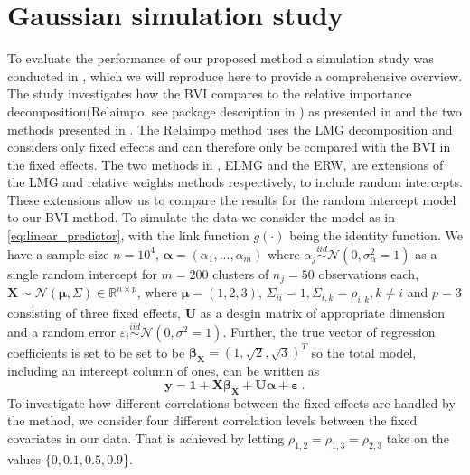 \section{Gaussian simulation study}
\label{sec:simulations}
To evaluate the performance of our proposed method a simulation study was conducted in \citet{Arnstad:Relative_variable_importance_in_Bayesian_linear_mixed_models:2024}, which we will reproduce here to provide a comprehensive overview. The study investigates how the BVI compares to the relative importance decomposition(Relaimpo, see package description in \citet{groemping2023relaimpo}) as presented in \citet{gromping_relaimpo} and the two methods presented in \citet{matre}.
The Relaimpo method uses the LMG decomposition and considers only fixed effects and can therefore only be compared with the BVI in the fixed effects. The two methods in \citet{matre}, ELMG and the ERW, are extensions of the LMG and relative weights methods respectively, to include random intercepts.
These extensions allow us to compare the results for the random intercept model to our BVI method.
\newline
\newline
To simulate the data we consider the model as in \eqref{eq:linear_predictor}, with the link function $g(\cdot)$ being the identity function. We have a sample size $n=10^4$, $\boldsymbol{\alpha}=(\alpha_1, ..., \alpha_m)$ where $\alpha_j \stackrel{iid}{\sim} \mathcal{N}(0, \sigma^2_{\alpha}=1)$ as a single random intercept for $m=200$ clusters of $n_j=50$ observations each, $\mathbf{X} \sim \mathcal{N}(\boldsymbol{\mu},\Sigma) \in \mathbb{R}^{n \times p}$, where $\boldsymbol{\mu}=(1, 2, 3)$, $\Sigma_{ii} = 1, \Sigma_{i, k}=\rho_{i, k}, k\neq i$ and $p=3$ consisting of three fixed effects, $\mathbf{U}$ as a desgin matrix of appropriate dimension and a random error $\varepsilon_i \stackrel{iid}{\sim} \mathcal{N}(0, \sigma^2=1)$. 
Further, the true vector of regression coefficients is set to be set to be $\boldsymbol{\beta}_{\mathbf{X}}=(1, \sqrt{2}, \sqrt{3})^T$ so the total model, including an intercept column of ones, can be written as
\begin{equation}
    \label{eq:simulation_model}
    \mathbf{y} = \mathbf{1} + \mathbf{X}\boldsymbol{\beta}_{\mathbf{X}} + \mathbf{U}\boldsymbol{\alpha} + \boldsymbol{\varepsilon} \ .
\end{equation}
To investigate how different correlations between the fixed effects are handled by the method, we consider four different correlation levels between the fixed covariates in our data. That is achieved by letting $\rho_{1, 2} = \rho_{1, 3} = \rho_{2, 3}$ take on the values $\{0, 0.1, 0.5, 0.9$\}.

